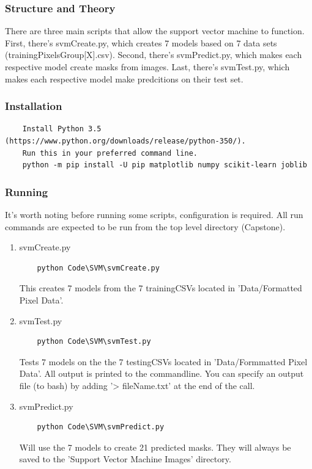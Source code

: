 \documentclass[10pt,journal,compsoc, draftclsnofoot,onecolumn]{IEEEtran}
\begin{document}
\subsubsection{Structure and Theory}
There are three main scripts that allow the support vector machine to function.
First, there's svmCreate.py, which creates 7 models based on 7 data sets (trainingPixelsGroup[X].csv).
Second, there's svmPredict.py, which makes each respective model create masks from images.
Last, there's svmTest.py, which makes each respective model make predcitions on their test set.

\subsubsection{Installation}
\begin{verbatim}
    Install Python 3.5 (https://www.python.org/downloads/release/python-350/).
    Run this in your preferred command line.
    python -m pip install -U pip matplotlib numpy scikit-learn joblib
\end{verbatim}

\subsubsection{Running}
It's worth noting before running some scripts, configuration is required.
All run commands are expected to be run from the top level directory (Capstone).

\begin{enumerate}
\item svmCreate.py
\begin{verbatim}
    python Code\SVM\svmCreate.py
\end{verbatim}
This creates 7 models from the 7 trainingCSVs located in 'Data/Formatted Pixel Data'.

\item svmTest.py
\begin{verbatim}
    python Code\SVM\svmTest.py
\end{verbatim}
Tests 7 models on the the 7 testingCSVs located in 'Data/Formmatted Pixel Data'.
All output is printed to the commandline.
You can specify an output file (to bash) by adding '> fileName.txt' at the end of the call.

\item svmPredict.py
\begin{verbatim}
    python Code\SVM\svmPredict.py
\end{verbatim}
Will use the 7 models to create 21 predicted masks.
They will always be saved to the 'Support Vector Machine Images' directory.
\end{enumerate}
\end{document}
